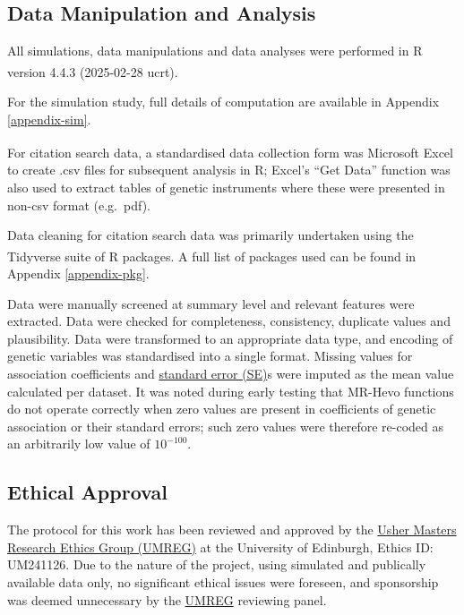 \documentclass[
]{article}
\begin{document}
\subsection{Data Manipulation and Analysis}\label{data-manipulation-and-analysis}

All simulations, data manipulations and data analyses were performed in R version 4.4.3 (2025-02-28 ucrt)\textsuperscript{}.

For the simulation study, full details of computation are available in Appendix \ref{appendix-sim}.

For citation search data, a standardised data collection form was Microsoft Excel\textsuperscript{} to create .csv files for subsequent analysis in R; Excel's ``Get Data'' function was also used to extract tables of genetic instruments where these were presented in non-csv format (e.g.~pdf).

Data cleaning for citation search data was primarily undertaken using the Tidyverse suite of R packages\textsuperscript{}. A full list of packages used can be found in Appendix \ref{appendix-pkg}.

Data were manually screened at summary level and relevant features were extracted. Data were checked for completeness, consistency, duplicate values and plausibility. Data were transformed to an appropriate data type, and encoding of genetic variables was standardised into a single format. Missing values for association coefficients and \hyperref[acronyms_SE]{standard error (SE)}s were imputed as the mean value calculated per dataset. It was noted during early testing that MR-Hevo functions do not operate correctly when zero values are present in coefficients of genetic association or their standard errors; such zero values were therefore re-coded as an arbitrarily low value of \(10^{-100}\).

\subsection{Ethical Approval}\label{ethical-approval}

The protocol for this work has been reviewed and approved by the \hyperref[acronyms_UMREG]{Usher Masters Research Ethics Group (UMREG)} at the University of Edinburgh, Ethics ID: UM241126. Due to the nature of the project, using simulated and publically available data only, no significant ethical issues were foreseen, and sponsorship was deemed unnecessary by the \hyperref[acronyms_UMREG]{UMREG} reviewing panel.
\end{document}
